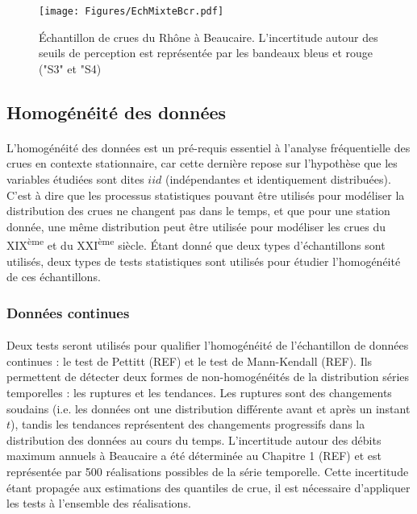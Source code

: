 \documentclass[11pt]{article}
\begin{document}
	\begin{figure}[h]
		\texttt{[image: Figures/EchMixteBcr.pdf]}	
		\caption{Échantillon de crues du Rhône à Beaucaire. L'incertitude autour des seuils de perception est représentée par les bandeaux bleus et rouge ("S3" et "S4)}
		\label{fig:EchMixte}
	\end{figure}
	

	\subsection{Homogénéité des données}
	\paragraph{} L'homogénéité des données est un pré-requis essentiel à l'analyse fréquentielle des crues en contexte stationnaire, car cette dernière repose sur l'hypothèse que les variables étudiées sont dites $iid$ (indépendantes et identiquement distribuées). C'est à dire que les processus statistiques pouvant être utilisés pour modéliser la distribution des crues ne changent pas dans le temps, et que pour une station donnée, une même distribution peut être utilisée pour modéliser les crues du XIX\textsuperscript{ème} et du XXI\textsuperscript{ème} siècle. Étant donné que deux types d'échantillons sont utilisés, deux types de tests statistiques sont utilisés pour étudier l'homogénéité de ces échantillons. 

	\subsubsection{Données continues}
	
	\paragraph{} Deux tests seront utilisés pour qualifier l'homogénéité de l'échantillon de données continues : le test de Pettitt (REF) et le test de Mann-Kendall (REF). Ils permettent de détecter deux formes de non-homogénéités de la distribution séries temporelles : les ruptures et les tendances. Les ruptures sont des changements soudains (i.e. les données ont une distribution différente avant et après un instant $t$), tandis les tendances représentent des changements progressifs dans la distribution des données au cours du temps. L'incertitude autour des débits maximum annuels à Beaucaire a été déterminée au Chapitre 1 (REF) et est représentée par 500 réalisations possibles de la série temporelle. Cette incertitude étant propagée aux estimations des quantiles de crue, il est nécessaire d'appliquer les tests à l'ensemble des réalisations.
\end{document}
